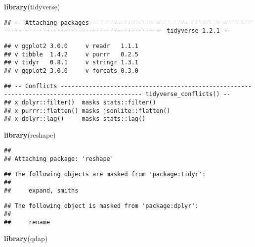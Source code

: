 \documentclass[]{article}
\newenvironment{Shaded}{\begin{snugshade}}{\end{snugshade}}
\newcommand{\KeywordTok}[1]{\textcolor[rgb]{0.13,0.29,0.53}{\textbf{#1}}}
\newcommand{\NormalTok}[1]{#1}
\begin{document}
\begin{Shaded}
\begin{Highlighting}[]
\KeywordTok{library}\NormalTok{(tidyverse)}
\end{Highlighting}
\end{Shaded}

\begin{verbatim}
## -- Attaching packages ------------------------------------------------------------------------------------------ tidyverse 1.2.1 --
\end{verbatim}

\begin{verbatim}
## v ggplot2 3.0.0     v readr   1.1.1
## v tibble  1.4.2     v purrr   0.2.5
## v tidyr   0.8.1     v stringr 1.3.1
## v ggplot2 3.0.0     v forcats 0.3.0
\end{verbatim}

\begin{verbatim}
## -- Conflicts --------------------------------------------------------------------------------------------- tidyverse_conflicts() --
## x dplyr::filter()  masks stats::filter()
## x purrr::flatten() masks jsonlite::flatten()
## x dplyr::lag()     masks stats::lag()
\end{verbatim}

\begin{Shaded}
\begin{Highlighting}[]
\KeywordTok{library}\NormalTok{(reshape)}
\end{Highlighting}
\end{Shaded}

\begin{verbatim}
## 
## Attaching package: 'reshape'
\end{verbatim}

\begin{verbatim}
## The following objects are masked from 'package:tidyr':
## 
##     expand, smiths
\end{verbatim}

\begin{verbatim}
## The following object is masked from 'package:dplyr':
## 
##     rename
\end{verbatim}

\begin{Shaded}
\begin{Highlighting}[]
\KeywordTok{library}\NormalTok{(qdap)}
\end{Highlighting}
\end{Shaded}
\end{document}
